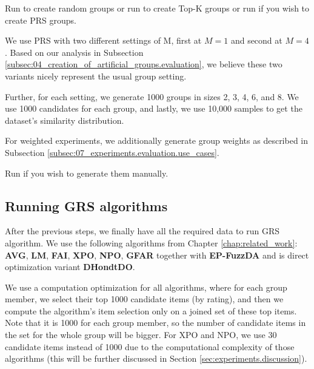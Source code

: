         Run  to create random groups \newline
        or run  to create Top-K groups \newline
        or run  if you wish to create PRS groups.
        
        We use PRS with two different settings of M, first at $M=1$ and second at $M=4$. Based on our analysis in Subsection \ref{subsec:04_creation_of_artificial_groups.evaluation}, we believe these two variants nicely represent the usual group setting.
        
        Further, for each setting, we generate 1000 groups in sizes 2, 3, 4, 6, and 8. We use 1000 candidates for each group, and lastly, we use 10,000 samples to get the dataset's similarity distribution.

        For weighted experiments, we additionally generate group weights as described in Subsection \ref{subsec:07_experiments.evaluation.use_cases}.
        
        Run  if you wish to generate them manually.
    
    \subsection{Running GRS algorithms}
        After the previous steps, we finally have all the required data to run GRS algorithm. We use the following algorithms from Chapter \ref{chap:related_work}: \textbf{AVG}, \textbf{LM}, \textbf{FAI}, \textbf{XPO\cite{sacharidis_2019_top_n_with_fairness}}, \textbf{NPO}, \textbf{GFAR\cite{GFAR-kaya2020}} together with \textbf{EP-FuzzDA} and is direct optimization variant \textbf{DHondtDO}.

        We use a computation optimization for all algorithms, where for each group member, we select their top 1000 candidate items (by rating), and then we compute the algorithm's item selection only on a joined set of these top items. Note that it is 1000 for each group member, so the number of candidate items in the set for the whole group will be bigger. For XPO and NPO, we use 30 candidate items instead of 1000 due to the computational complexity of those algorithms (this will be further discussed in Section \ref{sec:experiments.discussion}).

